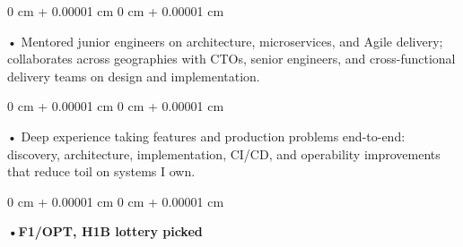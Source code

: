 \documentclass[10pt, letterpaper]{article}
\newenvironment{onecolentry}{
    \begin{adjustwidth}{
        0 cm + 0.00001 cm
    }{
        0 cm + 0.00001 cm
    }
}{
    \end{adjustwidth}
} %
\begin{document}
        \begin{onecolentry}
            • Mentored junior engineers on architecture, microservices, and Agile delivery; collaborates across geographies with CTOs, senior engineers, and cross-functional delivery teams on design and implementation.
        \end{onecolentry}
        \begin{onecolentry}
            • Deep experience taking features and production problems end-to-end: discovery, architecture, implementation, CI/CD, and operability improvements that reduce toil on systems I own.
        \end{onecolentry}
        \begin{onecolentry}
                \textbf{•F1/OPT, H1B lottery picked}
        \end{onecolentry}

    \vspace{2 pt }
\end{document}
